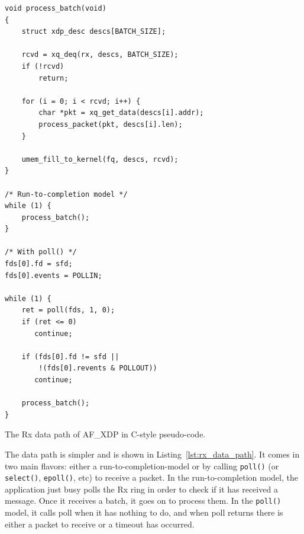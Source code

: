 \documentclass[9pt,numbers,reprint]{sigplanconf}
\begin{document}
\begin{listing}[p]
\begin{verbatim}
void process_batch(void)
{
    struct xdp_desc descs[BATCH_SIZE];

    rcvd = xq_deq(rx, descs, BATCH_SIZE);
    if (!rcvd)
        return;

    for (i = 0; i < rcvd; i++) {
        char *pkt = xq_get_data(descs[i].addr);
        process_packet(pkt, descs[i].len);
    }

    umem_fill_to_kernel(fq, descs, rcvd);
}

/* Run-to-completion model */
while (1) {
    process_batch();
}

/* With poll() */
fds[0].fd = sfd;
fds[0].events = POLLIN;

while (1) {
    ret = poll(fds, 1, 0);
    if (ret <= 0)
       continue;

    if (fds[0].fd != sfd ||
        !(fds[0].revents & POLLOUT))
       continue;

    process_batch();
}
\end{verbatim}
\caption{The Rx data path of AF\_XDP in C-style pseudo-code.}
\label{lst:rx_data_path}
\end{listing}

The data path is simpler and is shown in
Listing~\ref{lst:rx_data_path}. It comes in two main flavors: either a
run-to-completion-model or by calling {\tt poll()} (or {\tt select()},
{\tt epoll()}, etc) to receive a packet. In the run-to-completion
model, the application just busy polls the Rx ring in order to check
if it has received a message. Once it receives a batch, it goes on to
process them. In the {\tt poll()} model, it calls poll when it has
nothing to do, and when poll returns there is either a packet to
receive or a timeout has occurred.
\end{document}
